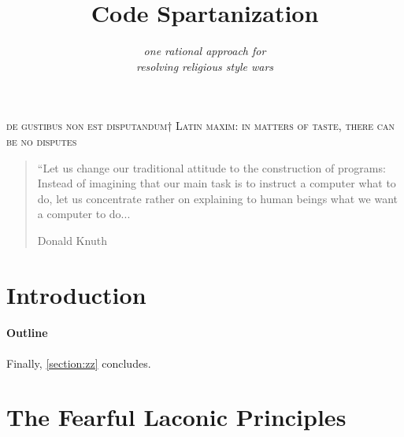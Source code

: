 \documentclass[preprint,10pt,nonatbib]{sigplanconf}
\title{Code Spartanization}
\subtitle{\scriptsize \emph{one rational approach for \\ resolving  religious style wars}}
\begin{document}
\textsc{de gustibus non est disputandum†{%
    Latin maxim: in matters of taste, there can be no disputes
}}
{\let\newpage\relax\maketitle}
\begin{flushright}
  \begin{minipage}{2.5in}
    \normalsize \rmfamily\scshape
    \color{red}{%
      suum cuique \newline
      Tu mortale, essere avvertiti. \newline
      Tu non Shallt Rimuovere \newline
      Questo comandamento \newline
      Mentre ci sono segni di Haste \newline
      in questo documento !!!! \newline
    }
  \end{minipage}
\end{flushright}

\begin{quote}
 “Let us change our traditional attitude to the construction of
programs: Instead of imagining that our main task is to instruct a
computer what to do, let us concentrate rather on explaining to
human beings what we want a computer to do... 

Donald Knuth
\end{quote}


\begin{abstract}
  
\end{abstract}
\section{Introduction}


\paragraph{Outline}
\label{section:principia}
\label{section:techniques}
\label{section:look}
\label{section:jack}
\label{section:look}
\label{section:initial}
\label{section:zz}
Finally, \cref{section:zz} concludes.

\section{The Fearful Laconic Principles}
\label{section:principia}

\end{document}
